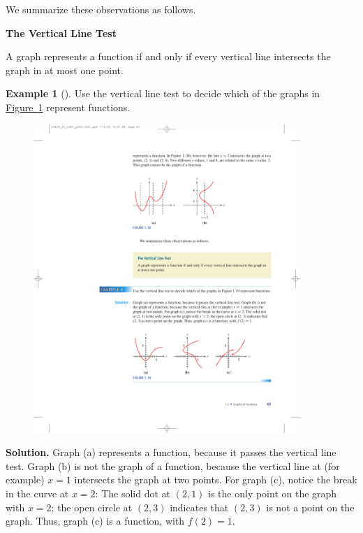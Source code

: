 \documentclass[10pt,]{book}
\theoremstyle{plain}
\theoremstyle{definition}
\theoremstyle{definition}
\newtheorem{example}[theorem]{Example}
\theoremstyle{definition}
\theoremstyle{definition}
\numberwithin{equation}{section}
\begin{document}
We summarize these observations as follows.%
\begin{mdframed}[style=assemblage]%
\noindent\textbf{\large The Vertical Line Test}\label{assemblage-8}\par\medskip
A graph represents a function if and only if every vertical line intersects the graph in
at most one point.%
\end{mdframed}
\begin{example}[]\label{example-vertical-line-test}
Use the vertical line test to decide which of the graphs in \hyperref[fig-vertical-line-test2]{Figure~\ref{fig-vertical-line-test2}}  represent functions.%
\leavevmode%
\begin{figure}
\centering
\includegraphics[width=0.90\textwidth,]{images/fig-vertical-line-test2.pdf}\caption{\label{fig-vertical-line-test2}}
\end{figure}
\par\medskip\noindent%
\textbf{Solution.}\quad 
    Graph (a) represents a function, because it passes the vertical line test. Graph (b) is not the graph of a function, because the vertical line at (for example) \(x = 1\) intersects the graph at two points. For graph (c), notice the break in the curve at \(x = 2\): The solid dot at \((2, 1)\) is the only point on the graph with \(x = 2\); the open circle at \((2, 3)\) indicates that \((2, 3)\) is not a point on the graph. Thus, graph (c) is a function, with \(f(2) = 1\).
\end{example}
\end{document}
